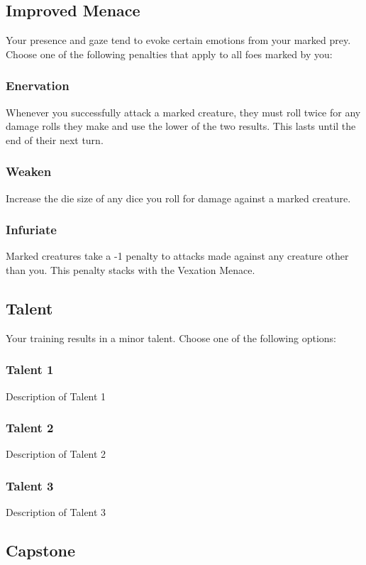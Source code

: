 \subsection*{Improved Menace}
Your presence and gaze tend to evoke certain emotions from your marked prey. Choose one of the following penalties that apply to all foes marked by you:

\subsubsection{Enervation}
Whenever you successfully attack a marked creature, they must roll twice for any damage rolls they make and use the lower of the two results. This lasts until the end of their next turn.

\subsubsection{Weaken}
Increase the die size of any dice you roll for damage against a marked creature.

\subsubsection{Infuriate}
Marked creatures take a -1 penalty to attacks made against any creature other than you. This penalty stacks with the Vexation Menace.

\vspace{.1 in}

\subsection*{Talent}
Your training results in a minor talent. Choose one of the following options:

\subsubsection{Talent 1}
Description of Talent 1

\subsubsection{Talent 2}
Description of Talent 2

\subsubsection{Talent 3}
Description of Talent 3

\vspace{.1 in}

\subsection*{Capstone}
\lipsum[1]